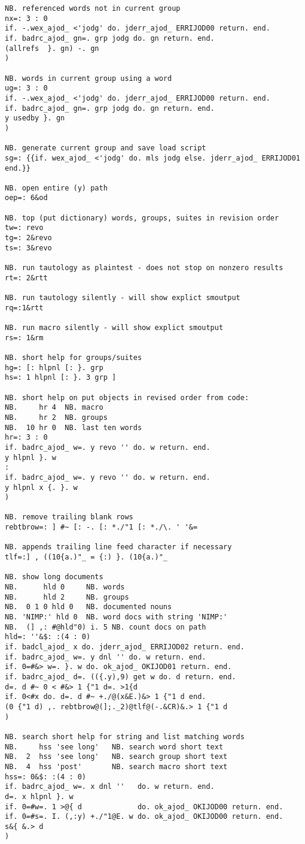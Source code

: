 \begin{lstlisting}[frame=single,framerule=0pt,basicstyle=\ttfamily\footnotesize]
NB. referenced words not in current group
nx=: 3 : 0
if. -.wex_ajod_ <'jodg' do. jderr_ajod_ ERRIJOD00 return. end.
if. badrc_ajod_ gn=. grp jodg do. gn return. end.
(allrefs  }. gn) -. gn
)
   
NB. words in current group using a word
ug=: 3 : 0
if. -.wex_ajod_ <'jodg' do. jderr_ajod_ ERRIJOD00 return. end.
if. badrc_ajod_ gn=. grp jodg do. gn return. end.
y usedby }. gn
)
   
NB. generate current group and save load script
sg=: {{if. wex_ajod_ <'jodg' do. mls jodg else. jderr_ajod_ ERRIJOD01 end.}}

NB. open entire (y) path
oep=: 6&od

NB. top (put dictionary) words, groups, suites in revision order
tw=: revo
tg=: 2&revo
ts=: 3&revo

NB. run tautology as plaintest - does not stop on nonzero results
rt=: 2&rtt

NB. run tautology silently - will show explict smoutput
rq=:1&rtt

NB. run macro silently - will show explict smoutput
rs=: 1&rm

NB. short help for groups/suites
hg=: [: hlpnl [: }. grp
hs=: 1 hlpnl [: }. 3 grp ]

NB. short help on put objects in revised order from code:
NB.     hr 4  NB. macro
NB.     hr 2  NB. groups
NB.  10 hr 0  NB. last ten words
hr=: 3 : 0
if. badrc_ajod_ w=. y revo '' do. w return. end.
y hlpnl }. w
:
if. badrc_ajod_ w=. y revo '' do. w return. end.
y hlpnl x {. }. w
)

NB. remove trailing blank rows
rebtbrow=: ] #~ [: -. [: *./"1 [: *./\. ' '&=

NB. appends trailing line feed character if necessary
tlf=:] , ((10{a.)"_ = {:) }. (10{a.)"_

NB. show long documents
NB.      hld 0     NB. words
NB.      hld 2     NB. groups
NB.  0 1 0 hld 0   NB. documented nouns
NB. 'NIMP:' hld 0  NB. word docs with string 'NIMP:'
NB.  (] ,: #@hld"0) i. 5 NB. count docs on path
hld=: ''&$: :(4 : 0)
if. badcl_ajod_ x do. jderr_ajod_ ERRIJOD02 return. end.
if. badrc_ajod_ w=. y dnl '' do. w return. end.
if. 0=#&> w=. }. w do. ok_ajod_ OKIJOD01 return. end.
if. badrc_ajod_ d=. (({.y),9) get w do. d return. end.
d=. d #~ 0 < #&> 1 {"1 d=. >1{d
if. 0<#x do. d=. d #~ +./@(x&E.)&> 1 {"1 d end.
(0 {"1 d) ,. rebtbrow@(];._2)@tlf@(-.&CR)&.> 1 {"1 d
)

NB. search short help for string and list matching words
NB.     hss 'see long'   NB. search word short text 
NB.  2  hss 'see long'   NB. search group short text
NB.  4  hss 'post'       NB. search macro short text 
hss=: 0&$: :(4 : 0)
if. badrc_ajod_ w=. x dnl ''   do. w return. end.
d=. x hlpnl }. w
if. 0=#w=. 1 >@{ d             do. ok_ajod_ OKIJOD00 return. end.
if. 0=#s=. I. (,:y) +./"1@E. w do. ok_ajod_ OKIJOD00 return. end.
s&{ &.> d
)


\end{lstlisting}
